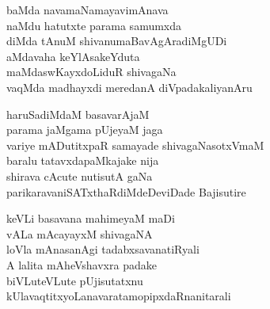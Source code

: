 \begin{entry}
\gl{}
\end{entry}

\begin{entry}
\gl{}
\begin{shl}
baMda navamaNamayavimAnava\\
naMdu hatutxte parama samumxda\\
diMda tAnuM shivanumaBavAgAradiMgUDi\\
aMdavaha keYlAsakeYduta\\
maMdaswKayxdoLiduR shivagaNa\\
vaqMda madhayxdi meredanA diVpadakaliyanAru
\end{shl}
\end{entry}

\begin{entry}
\gl{}
\begin{shl}
haruSadiMdaM basavarAjaM\\
parama jaMgama pUjeyaM jaga\\
variye mADutitxpaR samayade shivagaNasotxVmaM\\
baralu tatavxdapaMkajake nija\\
shirava cAcute nutisutA gaNa\\
parikaravaniSATxthaRdiMdeDeviDade Bajisutire
\end{shl}
\end{entry}

\begin{entry}
\mng{}
\end{entry}

\begin{entry}
\gl{}
\begin{shl}
keVLi basavana mahimeyaM maDi\\
vALa mAcayayxM shivagaNA\\
loVla mAnasanAgi tadabxsavanatiRyali\\
A lalita mAheVshavxra padake\\
biVLuteVLute pUjisutatxnu\\
kUlavaqtitxyoLanavaratamopipxdaRnanitarali
\end{shl}
\end{entry}

